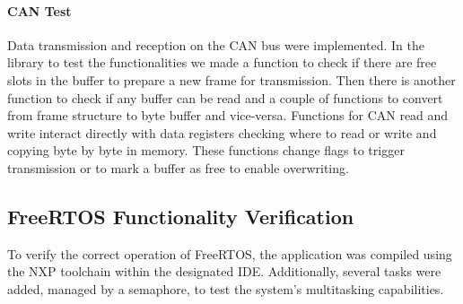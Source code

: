 \paragraph{CAN Test}

Data transmission and reception on the CAN bus were implemented. In the library to test the functionalities we made a function to check if there are free slots in the buffer to prepare a new frame for transmission. Then there is another function to check if any buffer can be read and a couple of functions to convert from frame structure to byte buffer and vice-versa. Functions for CAN read and write interact directly with data registers checking where to read or write and copying byte by byte in memory. These functions change flags to trigger transmission or to mark a buffer as free to enable overwriting.


\subsection{FreeRTOS Functionality Verification}
To verify the correct operation of FreeRTOS, the application was compiled using the NXP toolchain within the designated IDE. Additionally, several tasks were added, managed by a semaphore, to test the system's multitasking capabilities.

